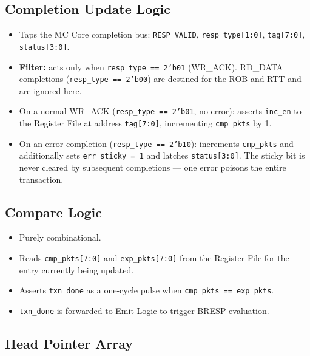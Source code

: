 \subsection{Completion Update Logic}

\begin{itemize}
  \item Taps the MC Core completion bus: \texttt{RESP\_VALID},
        \texttt{resp\_type[1:0]}, \texttt{tag[7:0]},
        \texttt{status[3:0]}.
  \item \textbf{Filter:} acts only when \texttt{resp\_type == 2'b01}
        (WR\_ACK). RD\_DATA completions (\texttt{resp\_type == 2'b00})
        are destined for the ROB and RTT and are ignored here.
  \item On a normal WR\_ACK (\texttt{resp\_type == 2'b01}, no error):
        asserts \texttt{inc\_en} to the Register File at address
        \texttt{tag[7:0]}, incrementing \texttt{cmp\_pkts} by 1.
  \item On an error completion (\texttt{resp\_type == 2'b10}):
        increments \texttt{cmp\_pkts} and additionally sets
        \texttt{err\_sticky = 1} and latches \texttt{status[3:0]}.
        The sticky bit is never cleared by subsequent completions —
        one error poisons the entire transaction.
\end{itemize}

\subsection{Compare Logic}

\begin{itemize}
  \item Purely combinational.
  \item Reads \texttt{cmp\_pkts[7:0]} and \texttt{exp\_pkts[7:0]} from
        the Register File for the entry currently being updated.
  \item Asserts \texttt{txn\_done} as a one-cycle pulse when
        \texttt{cmp\_pkts == exp\_pkts}.
  \item \texttt{txn\_done} is forwarded to Emit Logic to trigger BRESP
        evaluation.
\end{itemize}

\subsection{Head Pointer Array}

